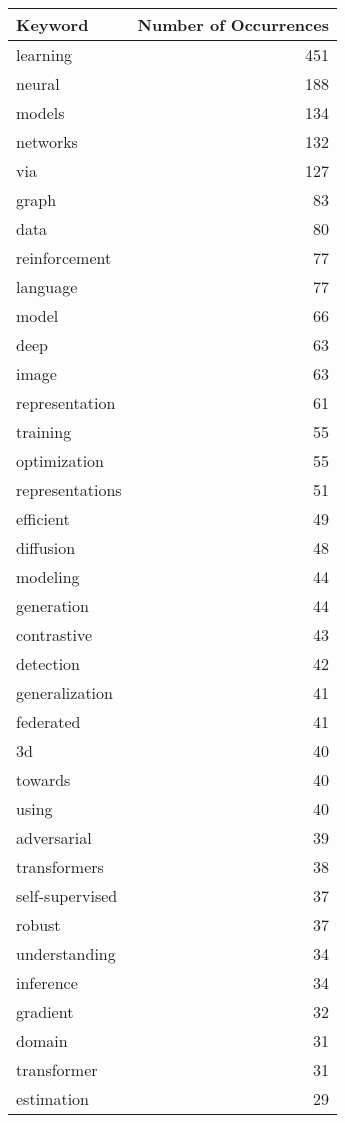 \begin{table}[h]
\centering
\begin{tabular}{|l|r|}
\hline
Keyword & Number of Occurrences \\
\hline
learning & 451 \\
\hline
neural & 188 \\
\hline
models & 134 \\
\hline
networks & 132 \\
\hline
via & 127 \\
\hline
graph & 83 \\
\hline
data & 80 \\
\hline
reinforcement & 77 \\
\hline
language & 77 \\
\hline
model & 66 \\
\hline
deep & 63 \\
\hline
image & 63 \\
\hline
representation & 61 \\
\hline
training & 55 \\
\hline
optimization & 55 \\
\hline
representations & 51 \\
\hline
efficient & 49 \\
\hline
diffusion & 48 \\
\hline
modeling & 44 \\
\hline
generation & 44 \\
\hline
contrastive & 43 \\
\hline
detection & 42 \\
\hline
generalization & 41 \\
\hline
federated & 41 \\
\hline
3d & 40 \\
\hline
towards & 40 \\
\hline
using & 40 \\
\hline
adversarial & 39 \\
\hline
transformers & 38 \\
\hline
self-supervised & 37 \\
\hline
robust & 37 \\
\hline
understanding & 34 \\
\hline
inference & 34 \\
\hline
gradient & 32 \\
\hline
domain & 31 \\
\hline
transformer & 31 \\
\hline
estimation & 29 \\

\end{tabular}
\end{table}
